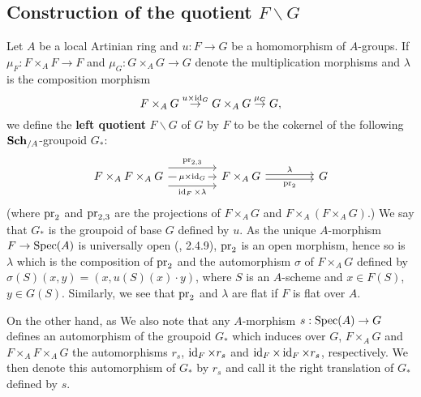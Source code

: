\subsection{Construction of the quotient \texorpdfstring{$F\backslash G$}{FG}}
Let $A$ be a local Artinian ring and $u:F\to G$ be a homomorphism of $A$-groups. If $\mu_F:F\times_AF\to F$ and $\mu_G:G\times_AG\to G$ denote the multiplication morphisms and $\lambda$ is the composition morphism
\[F\times_AG\stackrel{u\times\operatorname{id}_G}{\to} G\times_AG\stackrel{\mu_G}{\to} G,\]
we define the \textbf{left quotient} $F\backslash G$ of $G$ by $F$ to be the cokernel of the following $\mathbf{Sch}_{/A}$-groupoid $G_*$:
\[\begin{tikzcd}[column sep=15mm]
F\times_A F\times_AG\ar[r,shift left=8pt,"\pr_{2,3}"]\ar[r,shift right=8pt,swap,"\id_F\times\lambda"]\ar[r,"\mu\times\id_G"description]&F\times_AG\ar[r,shift left=2pt,"\lambda"]\ar[r,shift right=2pt,swap,"\pr_2"]&G
\end{tikzcd}\]
(where $\mathrm{pr}_2$ and $\mathrm{pr}_{2,3}$ are the projections of $F\times_AG$ and $F\times_A(F\times_AG)$.) We say that $G_*$ is the groupoid of base $G$ defined by $u$. As the unique $A$-morphism $F\to\mathrm{Spec}(A)$ is universally open (\cite{EGA4-2}, 2.4.9), $\mathrm{pr}_2$ is an open morphism, hence so is $\lambda$ which is the composition of $\mathrm{pr}_2$ and the automorphism $\sigma$ of $F\times_AG$ defined by $\sigma(S)(x,y)=(x,u(S)(x)\cdot y)$, where $S$ is an $A$-scheme and $x\in F(S)$, $y\in G(S)$. Similarly, we see that $\mathrm{pr}_2$ and $\lambda$ are flat if $F$ is flat over $A$.\par
On the other hand, as 
We also note that any $A$-morphism $s:\mathrm{Spec}(A)\to G$ defines an automorphism of the groupoid $G_*$ which induces over $G$, $F\times_AG$ and $F\times_AF\times_AG$ the automorphisms $r_s$, $\operatorname{id}_F\times r_s$ and $\operatorname{id}_F\times\operatorname{id}_F\times r_s$, respectively. We then denote this automorphism of $G_*$ by $r_s$ and call it the right translation of $G_*$ defined by $s$.


